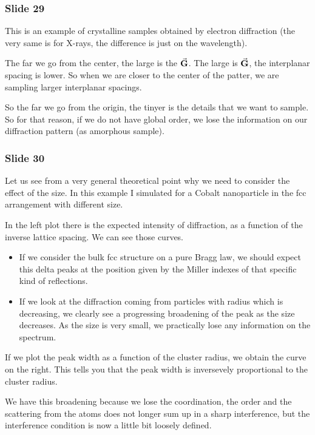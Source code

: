 \documentclass[../main/main.tex]{subfiles}
\begin{document}
\subsubsection{Slide 29}
This is an example of crystalline samples obtained by electron diffraction (the very same is for X-rays, the difference is just on the wavelength).

The far we go from the center, the large is the \( \va{G} \). The large is \( \va{G} \), the interplanar spacing is lower. So when we are closer to the center of the patter, we are sampling larger interplanar spacings.

So the far we go from the origin, the tinyer is the details that we want to sample. So for that reason, if we do not have global order, we lose the information on our diffraction pattern (as amorphous sample).


\subsubsection{Slide 30}
Let us see from a very general theoretical point why we need to consider the effect of the size. In this example I simulated for a Cobalt nanoparticle in the fcc arrangement with different size.

In the left plot there is the expected intensity of diffraction, as a function of the inverse lattice spacing.
We can see those curves.

\begin{itemize}
\item If we consider the bulk fcc structure on a pure Bragg law, we should expect this delta peaks at the position given by the Miller indexes of that specific kind of reflections.

\item If we look at the diffraction coming from particles with radius which is decreasing, we clearly see a progressing broadening of the peak as the size decreases. As the size is very small, we practically lose any information on the spectrum.
\end{itemize}

If we plot the peak width as a function of the cluster radius, we obtain the curve on the right. This tells you that the peak width is inversevely proportional to the cluster radius.

We have this broadening because we lose the coordination, the order and the scattering from the atoms does not longer sum up in a sharp interference, but the interference condition is now a little bit loosely defined.
\end{document}

